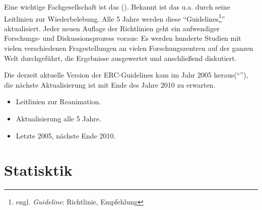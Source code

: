 {
Eine wichtige Fachgesellschaft ist das  (). Bekannt ist das  u.a. durch seine Leitlinien zur
Wiederbelebung. Alle 5 Jahre werden diese "`Guidelines\footnote{engl.
\emph{Guideline}: Richtlinie, Empfehlung}"' aktualisiert. Jeder neuen Auflage
der Richtlinien geht ein aufwendiger Forschungs- und Diskussionsprozess voraus: Es
werden hunderte Studien mit vielen verschiedenen Fragestellungen an vielen
Forschungszentren auf der ganzen Welt durchgeführt, die Ergebnisse ausgewertet und anschließend diskutiert. 

Die derzeit aktuelle Version
der ERC-Guidelines kam im Jahr 2005 heraus("`"'), die nächste
Aktualisierung ist mit Ende des Jahre 2010 zu erwarten.
}{
\begin{itemize}
   \item Leitlinien zur Reanimation.
   \item Aktualisierung alle 5 Jahre.
   \item Letzte 2005, nächste Ende 2010.
\end{itemize}

}{}{}{}


\section{Statisktik}


